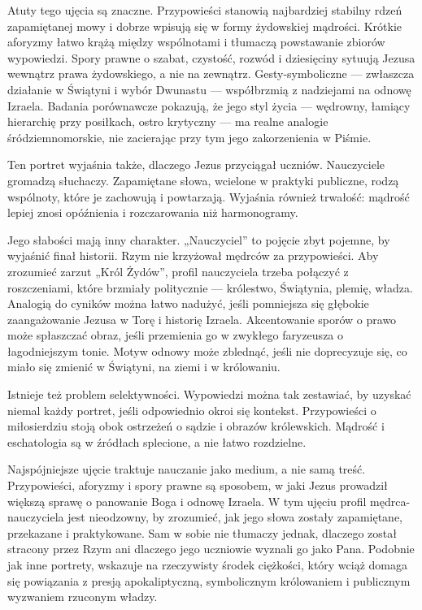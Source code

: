 Atuty tego ujęcia są znaczne.
Przypowieści stanowią najbardziej stabilny rdzeń zapamiętanej mowy i dobrze wpisują się w formy żydowskiej mądrości.
Krótkie aforyzmy łatwo krążą między wspólnotami i tłumaczą powstawanie zbiorów wypowiedzi.
Spory prawne o szabat, czystość, rozwód i dziesięciny sytuują Jezusa wewnątrz prawa żydowskiego, a nie na zewnątrz.
Gesty-symboliczne — zwłaszcza działanie w Świątyni i wybór Dwunastu — współbrzmią z nadziejami na odnowę Izraela.
Badania porównawcze pokazują, że jego styl życia — wędrowny, łamiący hierarchię przy posiłkach, ostro krytyczny — ma realne analogie śródziemnomorskie, nie zacierając przy tym jego zakorzenienia w Piśmie.

Ten portret wyjaśnia także, dlaczego Jezus przyciągał uczniów.
Nauczyciele gromadzą słuchaczy.
Zapamiętane słowa, wcielone w praktyki publiczne, rodzą wspólnoty, które je zachowują i powtarzają.
Wyjaśnia również trwałość: mądrość lepiej znosi opóźnienia i rozczarowania niż harmonogramy.

Jego słabości mają inny charakter.
„Nauczyciel” to pojęcie zbyt pojemne, by wyjaśnić finał historii.
Rzym nie krzyżował mędrców za przypowieści.
Aby zrozumieć zarzut „Król Żydów”, profil nauczyciela trzeba połączyć z roszczeniami, które brzmiały politycznie — królestwo, Świątynia, plemię, władza.
Analogią do cyników można łatwo nadużyć, jeśli pomniejsza się głębokie zaangażowanie Jezusa w Torę i historię Izraela.
Akcentowanie sporów o prawo może spłaszczać obraz, jeśli przemienia go w zwykłego faryzeusza o łagodniejszym tonie.
Motyw odnowy może zblednąć, jeśli nie doprecyzuje się, co miało się zmienić w Świątyni, na ziemi i w królowaniu.

Istnieje też problem selektywności.
Wypowiedzi można tak zestawiać, by uzyskać niemal każdy portret, jeśli odpowiednio okroi się kontekst.
Przypowieści o miłosierdziu stoją obok ostrzeżeń o sądzie i obrazów królewskich.
Mądrość i eschatologia są w źródłach splecione, a nie łatwo rozdzielne.

Najspójniejsze ujęcie traktuje nauczanie jako medium, a nie samą treść.
Przypowieści, aforyzmy i spory prawne są sposobem, w jaki Jezus prowadził większą sprawę o panowanie Boga i odnowę Izraela.
W tym ujęciu profil mędrca-nauczyciela jest nieodzowny, by zrozumieć, jak jego słowa zostały zapamiętane, przekazane i praktykowane.
Sam w sobie nie tłumaczy jednak, dlaczego został stracony przez Rzym ani dlaczego jego uczniowie wyznali go jako Pana.
Podobnie jak inne portrety, wskazuje na rzeczywisty środek ciężkości, który wciąż domaga się powiązania z presją apokaliptyczną, symbolicznym królowaniem i publicznym wyzwaniem rzuconym władzy.

